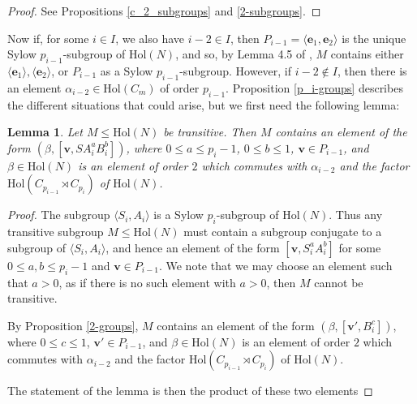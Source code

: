 \documentclass[a4paper,reqno]{amsart}
\newtheorem{lemma}[theorem]{Lemma}
\theoremstyle{definition}
\newcommand{\e}{\textbf{e}}
\newcommand{\Hol}{\mathrm{Hol}}
\begin{document}
\begin{proof}
    See Propositions \ref{c_2_subgroups} and \ref{2-subgroups}.
\end{proof}
Now if, for some $i \in I$, we also have $i-2 \in I$, then $P_{i-1}=\langle \e_1,\e_2 \rangle$ is the unique Sylow $p_{i-1}$-subgroup of $\Hol(N)$, and so, by Lemma 4.5 of \cite{BML21}, $M$ contains either $\langle \e_1 \rangle, \langle \e_2 \rangle$, or $P_{i-1}$ as a Sylow $p_{i-1}$-subgroup. However, if $i-2 \notin I$, then there is an element $\alpha_{i-2} \in \Hol(C_m)$ of order $p_{i-1}$. Proposition \ref{p_i-groups} describes the different situations that could arise, but we first need the following lemma:
\begin{lemma}\label{coprime_elt}
    Let $M \leq \Hol(N)$ be transitive. Then $M$ contains an element of the form $(\beta,[\mathbf{v},SA_i^aB_i^b])$, where $0 \leq a \leq p_i-1$, $0 \leq b \leq 1$, $\mathbf{v} \in P_{i-1}$, and $\beta \in \Hol(N)$ is an element of order $2$ which commutes with $\alpha_{i-2}$ and the factor $\Hol(C_{p_{i-1}} \rtimes C_{p_i})$ of $\Hol(N)$.
\end{lemma}
\begin{proof}
    The subgroup $\langle S_i, A_i \rangle$ is a Sylow $p_i$-subgroup of $\Hol(N)$. Thus any transitive subgroup $M\leq \Hol(N)$ must contain a subgroup conjugate to a subgroup of $\langle S_i, A_i \rangle$, and hence an element of the form $[\mathbf{v},S_i^aA_i^b]$ for some $0 \leq a,b \leq p_i-1$ and $\mathbf{v} \in P_{i-1}$. We note that we may choose an element such that $a>0$, as if there is no such element with $a>0$, then $M$ cannot be transitive.

    By Proposition \ref{2-groups}, $M$ contains an element of the form $(\beta,[\mathbf{v}',B_i^c])$, where $0 \leq c \leq 1$, $\mathbf{v}' \in P_{i-1}$, and $\beta \in \Hol(N)$ is an element of order $2$ which commutes with $\alpha_{i-2}$ and the factor $\Hol(C_{p_{i-1}} \rtimes C_{p_i})$ of $\Hol(N)$.

    The statement of the lemma is then the product of these two elements
\end{proof}
\end{document}
